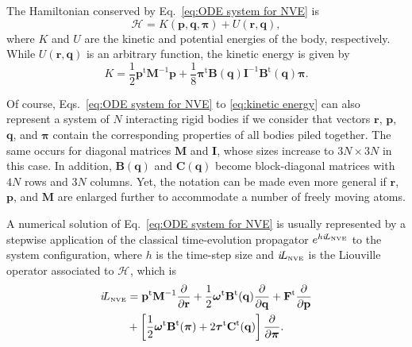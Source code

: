 \documentclass[
journal=jctcce,
layout=twocolumn
]{achemso}
\newcommand{\mt}[1]{\boldsymbol{\mathbf{#1}}}   %
\newcommand{\vt}[1]{\boldsymbol{\mathbf{#1}}}   %
\newcommand{\tr}[1]{#1^\text{t}}                %
\newcommand{\diff}[2]{\frac{\partial #1}{\partial #2}} %
\newcommand{\Ham}[1]{{\mathcal H}_\text{#1}}    %
\newcommand{\Liu}[1]{i\!L_\text{#1}}            %
\newcommand{\timestep}{h}
\begin{document}
The Hamiltonian conserved by Eq.~\eqref{eq:ODE system for NVE} is
\begin{equation}
\label{eq:Hamiltonian}
\Ham{} = K(\vt p, \vt q, \vt \pi) + U(\vt r,\vt q),
\end{equation}
where $K$ and $U$ are the kinetic and potential energies of the body, respectively.
While $U(\vt r, \vt q)$ is an arbitrary function, the kinetic energy is given by
\begin{equation}
\label{eq:kinetic energy}
K = \frac{1}{2} \tr{\vt p} {\mt M}^{-1} {\vt p} + \frac{1}{8} \tr{\vt \pi} {\mt B}(\vt q) {\mt I}^{-1} \tr{\mt B}(\vt q) {\vt \pi}.
\end{equation}

Of course, Eqs.~\eqref{eq:ODE system for NVE} to \eqref{eq:kinetic energy} can also represent a system of $N$ interacting rigid bodies if we consider that vectors $\vt r$, $\vt p$, $\vt q$, and $\vt \pi$ contain the corresponding properties of all bodies piled together.
The same occurs for diagonal matrices $\mt M$ and $\mt I$, whose sizes increase to $3N \times 3N$ in this case.
In addition, $\mt B(\vt q)$ and $\mt C(\vt q)$ become block-diagonal matrices with $4N$ rows and $3N$ columns.
Yet, the notation can be made even more general if $\vt r$, $\vt p$, and $\mt M$ are enlarged further to accommodate a number of freely moving atoms.

A numerical solution of Eq.~\eqref{eq:ODE system for NVE} is usually represented by a stepwise application of the classical time-evolution propagator \cite{Tuckerman_2010} $e^{\timestep \Liu{\tiny NVE}}$ to the system configuration, where $\timestep$ is the time-step size and $\Liu{\tiny NVE}$ is the Liouville operator associated to $\Ham{}$, which is
\begin{equation}
\label{eq:Lioville operator}
\begin{split}
\Liu{\tiny NVE} &= \tr{\vt p} {\mt M}^{-1} \diff{}{\vt r} + \frac{1}{2} \tr{\vt \omega} \tr{\mt B}(\vt q) \diff{}{\vt q} + \tr{\vt F} \diff{}{\vt p} \\
&+ \left[ \frac{1}{2} \tr{\vt \omega} \tr{\mt B}(\vt \pi) + 2 \tr{\vt \tau} \tr{\mt C}(\vt q) \right] \diff{}{\vt \pi}.
\end{split}
\end{equation}
\end{document}

